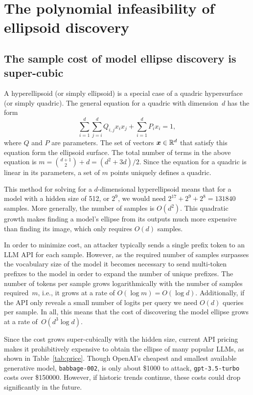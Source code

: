 \documentclass{article}
\begin{document}
\section{The polynomial infeasibility of ellipsoid discovery}

\subsection{The sample cost of model ellipse discovery is super-cubic}
\label{sec:samp}

A hyperellipsoid (or simply ellipsoid) is a special case of a quadric hypersurface\footnotemark{} (or simply quadric).
The general equation for a quadric with dimension~\(d\) has the form 
\[\sum_{i=1}^d\sum_{j=i}^dQ_{i,j}x_ix_j + \sum_{i=1}^dP_ix_i=1,\]
where \(Q\) and \(P\) are parameters.
The set of vectors \({\bm{x}}\in\mathbb{R}^d\) that satisfy this equation form the ellipsoid surface.
The total number of terms in the above equation is \(m=\binom{d+1}{2}+d=(d^2+3d)/2\).
Since the equation for a quadric is linear in its parameters,
a set of \(m\) points uniquely defines a quadric.

This method for solving for a \(d\)-dimensional hyperellipsoid means that for a model with a hidden size of 512, or \(2^9\), 
we would need \(2^{17} + 2^9 + 2^8=\num{131 840}\) samples. 
More generally, the number of samples is \(O(d^2)\).
This quadratic growth makes finding a model's ellipse from its outputs much more expensive than finding its image, which only requires \(O(d)\) samples.

In order to minimize cost, an attacker typically sends a single prefix token to an LLM API for each sample.
However, as the required number of samples surpasses the vocabulary size of the model it becomes necessary to send multi-token prefixes to the model in order to expand the number of unique prefixes.
The number of tokens per sample grows logarithmically with the number of samples required~\(m\), i.e., it grows at a rate of \(O(\log m)=O(\log d)\). 
Additionally, if the API only reveals a small number of logits per query we need \(O(d)\) queries per sample.
In all, this means that the cost of discovering the model ellipse grows at a rate of~\(O(d^3\log d)\).

Since the cost grows super-cubically with the hidden size, 
current API pricing makes it prohibitively expensive to obtain the ellipse of many popular LLMs, as shown in Table~\ref{tab:price}.
Though OpenAI's cheapest and smallest available generative model, \texttt{babbage-002}, is only about \$\num{1000} to attack, \texttt{gpt-3.5-turbo} costs over \$\num{150 000}.
However, if historic trends continue, these costs could drop significantly in the future.
\end{document}
